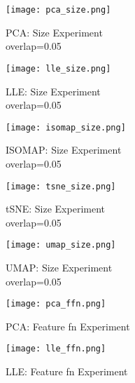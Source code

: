\documentclass[conference]{IEEEtran}
\begin{document}
\begin{figure}[htbp]
    \centerline{\texttt{[image: pca\_size.png]}}
    \caption[This is the caption; This is the second line]
        {PCA: Size Experiment\\ overlap=0.05 \endtabular}
    \label{fig:pca_size}
\end{figure}

\begin{figure}[htbp]
    \centerline{\texttt{[image: lle\_size.png]}}
    \caption[This is the caption; This is the second line]
        {LLE: Size Experiment\\ overlap=0.05 \endtabular}
    \label{fig:lle_size}
\end{figure}

\begin{figure}[htbp]
    \centerline{\texttt{[image: isomap\_size.png]}}
    \caption[This is the caption; This is the second line]
        {ISOMAP: Size Experiment\\ overlap=0.05 \endtabular}
    \label{fig:isomap_size}
\end{figure}

\begin{figure}[htbp]
    \centerline{\texttt{[image: tsne\_size.png]}}
    \caption[This is the caption; This is the second line]
        {tSNE: Size Experiment\\ overlap=0.05 \endtabular}
    \label{fig:isomap_size}
\end{figure}

\begin{figure}[htbp]
    \centerline{\texttt{[image: umap\_size.png]}}
    \caption[This is the caption; This is the second line]
        {UMAP: Size Experiment\\ overlap=0.05 \endtabular}
    \label{fig:umap_size}
\end{figure}


\begin{figure}[htbp]
    \centerline{\texttt{[image: pca\_ffn.png]}}
    \caption[This is the caption; This is the second line]
        {PCA: Feature fn Experiment \endtabular}
    \label{fig:pca_ffn}
\end{figure}

\begin{figure}[htbp]
    \centerline{\texttt{[image: lle\_ffn.png]}}
    \caption[This is the caption; This is the second line]
        {LLE: Feature fn Experiment \endtabular}
    \label{fig:lle_ffn}
\end{figure}
\end{document}
